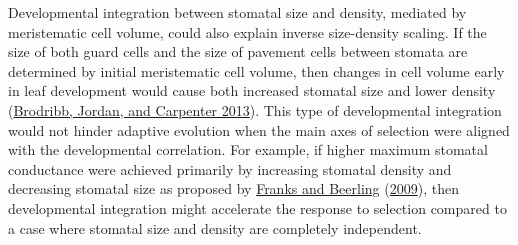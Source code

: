 \documentclass[
  10pt,
]{article}
\begin{document}
Developmental integration between stomatal size and density, mediated by meristematic cell volume, could also explain inverse size-density scaling. If the size of both guard cells and the size of pavement cells between stomata are determined by initial meristematic cell volume, then changes in cell volume early in leaf development would cause both increased stomatal size and lower density (\protect\hyperlink{ref-brodribb_unified_2013}{Brodribb, Jordan, and Carpenter 2013}). This type of developmental integration would not hinder adaptive evolution when the main axes of selection were aligned with the developmental correlation. For example, if higher maximum stomatal conductance were achieved primarily by increasing stomatal density and decreasing stomatal size as proposed by \protect\hyperlink{ref-franks_maximum_2009}{Franks and Beerling} (\protect\hyperlink{ref-franks_maximum_2009}{2009}), then developmental integration might accelerate the response to selection compared to a case where stomatal size and density are completely independent.
\end{document}
